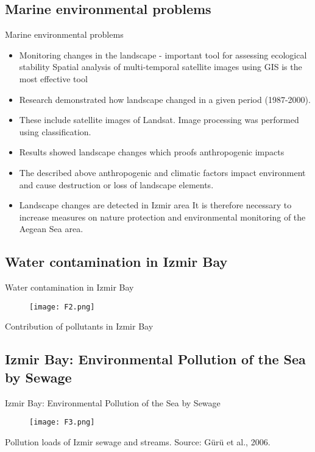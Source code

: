 \documentclass[pdflatex,compress,9pt,
	xcolor={dvipsnames,dvipsnames,svgnames,x11names,table},
	hyperref={colorlinks = true,breaklinks = true, urlcolor = NavyBlue, breaklinks = true}]{beamer}
\begin{document}
\subsection{Marine environmental problems}
\begin{frame}{Marine environmental problems}
\begin{itemize}
            \item Monitoring changes in the landscape - important tool for assessing ecological stability Spatial analysis of multi-temporal satellite images using GIS is the most effective tool 
            \item Research demonstrated how landscape changed in a given period (1987-2000).
            \item These include satellite images of Landsat. Image processing was performed using classification. 
            \item Results showed landscape changes which proofs anthropogenic impacts 
            \item The described above anthropogenic and climatic factors impact environment and cause destruction or loss of landscape elements. 
            \item Landscape changes are detected in Izmir area It is therefore necessary to increase measures on nature protection and environmental monitoring of the Aegean Sea area.
\end{itemize}
\end{frame}

\subsection{Water contamination in Izmir Bay}
\begin{frame}{Water contamination in Izmir Bay}
\begin{figure}[H]
	\centering
		\texttt{[image: F2.png]}
\end{figure}
Contribution of pollutants in Izmir Bay
\end{frame}

\subsection{Izmir Bay: Environmental Pollution of the Sea by Sewage}
\begin{frame}{Izmir Bay: Environmental Pollution of the Sea by Sewage}
\begin{figure}[H]
	\centering
		\texttt{[image: F3.png]}
\end{figure}
Pollution loads of Izmir sewage and streams. Source: G\"{u}r\"{u} et al., 2006.
\end{frame}
\end{document}
